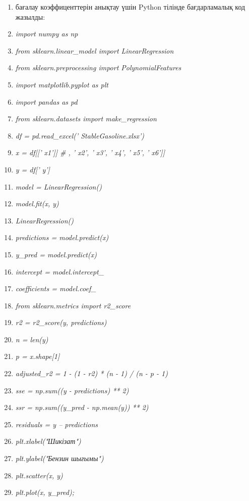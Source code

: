 \begin{enumerate}
\def\labelenumi{(\arabic{enumi})}
\item
  бағалау коэффиценттерін анықтау үшін Python тілінде бағдарламалық код
  жазылды:
\item
  \emph{import numpy as np}
\item
  \emph{from sklearn.linear\_model import LinearRegression}
\item
  \emph{from sklearn.preprocessing import PolynomialFeatures}
\item
  \emph{import matplotlib.pyplot as plt}
\item
  \emph{import pandas as pd}
\item
  \emph{from sklearn.datasets import make\_regression}
\item
  \emph{df =
  pd.read\_excel(' StableGasoline.xlsx')}
\item
  \emph{x = df{[}{[}' x1'{]}{]} \# ,
  ' x2',
  ' x3',
  ' x4',
  ' x5',
  ' x6'{]}{]}}
\item
  \emph{y = df{[}' y'{]}}
\item
  \emph{model = LinearRegression()}
\item
  \emph{model.fit(x, y)}
\item
  \emph{LinearRegression()}
\item
  \emph{predictions = model.predict(x)}
\item
  \emph{y\_pred = model.predict(x)}
\item
  \emph{intercept = model.intercept\_}
\item
  \emph{coefficients = model.coef\_}
\item
  \emph{from sklearn.metrics import r2\_score}
\item
  \emph{r2 = r2\_score(y, predictions)}
\item
  \emph{n = len(y)}
\item
  \emph{p = x.shape{[}1{]}}
\item
  \emph{adjusted\_r2 = 1 - (1 - r2) * (n - 1) / (n - p - 1)}
\item
  \emph{sse = np.sum((y - predictions) ** 2)}
\item
  \emph{ssr = np.sum((y\_pred - np.mean(y)) ** 2)}
\item
  \emph{residuals = y -- predictions}
\item
  \emph{plt.xlabel("Шикізат")}
\item
  \emph{plt.ylabel("Бензин шығымы")}
\item
  \emph{plt.scatter(x, y)}
\item
  \emph{plt.plot(x, y\_pred);}
\end{enumerate}


